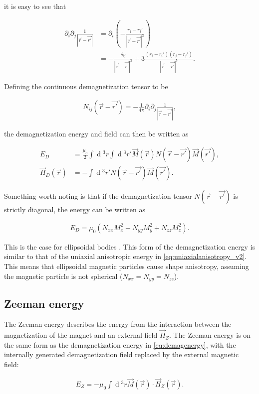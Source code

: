 \documentclass[1p]{elsarticle}		%
\renewcommand{\d}[1]{\ensuremath{\operatorname{d}\!{#1}}}
\numberwithin{equation}{section}
\begin{document}
it is easy to see that

\begin{align*}
\partial_i\partial_j \frac{1}{|\vec{r}-\vec{r'}|} &= \partial_i(-\frac{r_j-r_j'}{|\vec{r}-\vec{r'}|^3}) \\
&= -\frac{\delta_{ij}}{|\vec{r}-\vec{r'}|^3}+3\frac{(r_i-r_i')(r_j-r_j')}{|\vec{r}-\vec{r'}|^5}.
\end{align*}

Defining the continuous demagnetization tensor to be

\begin{align}
N_{ij}(\vec{r}-\vec{r'}) = -\frac{1}{4\pi}\partial_i\partial_j \frac{1}{|\vec{r}-\vec{r'}|},
\end{align}

the demagnetization energy and field can then be written as

\begin{align}
E_D &= \frac{\mu_0}{2} \int \d {^3}r \int \d {^3}r' \vec{M}(\vec{r}) N(\vec{r}-\vec{r'})\vec{M}(\vec{r'}), \\
\vec{H}_D(\vec{r}) &= - \int \d {^3}r' N(\vec{r}-\vec{r'})\vec{M}(\vec{r'}).
\end{align}

Something worth noting is that if the demagnetization tensor $\bar{N}(\vec{r}-\vec{r'})$ is strictly diagonal, the energy can be written as

\begin{align}
E_D = \mu_0(N_{xx}M_x^2+N_{yy}M_y^2+N_{zz}M_z^2).
\end{align}

This is the case for ellipsoidal bodies \cite{kruger2006current}. This form of the demagnetization energy is similar to that of the uniaxial anisotropic energy in \eqref{eq:uniaxialanisotropy_v2}. This means that ellipsoidal magnetic particles cause shape anisotropy, assuming the magnetic particle is not spherical ($N_{xx} = N_{yy} = N_{zz}$).


\subsection{Zeeman energy}
The Zeeman energy describes the energy from the interaction between the magnetization of the magnet and an external field $\vec{H}_{Z}$. The Zeeman energy is on the same form as the demagnetization energy in \eqref{eq:demagenergy}, with the internally generated demagnetization field replaced by the external magnetic field:

\begin{align}
\label{eq:zeemanenergy}
E_Z = -\mu_0\int \d {^3}r \vec{M}(\vec{r})\cdot\vec{H}_{Z}(\vec{r}).
\end{align}
\end{document}
